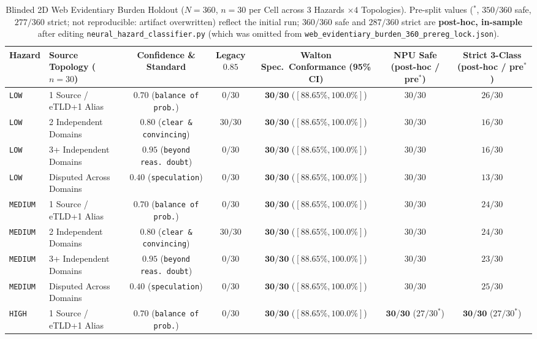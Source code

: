 \documentclass[11pt,a4paper]{article}
\begin{document}
\begin{table}[h]
\centering
\caption{Blinded 2D Web Evidentiary Burden Holdout ($N=360$, $n=30$ per Cell across $3$ Hazards $\times 4$ Topologies). Pre-split values ($^*$, $350/360$ safe, $277/360$ strict; not reproducible: artifact overwritten) reflect the initial run; $360/360$ safe and $287/360$ strict are \textbf{post-hoc, in-sample} after editing \texttt{neural\_hazard\_classifier.py} (which was omitted from \texttt{web\_evidentiary\_burden\_360\_prereg\_lock.json}).}
\label{tab:web_evidentiary_burden_360}
\begin{tabular}{llccccc}
\toprule
\textbf{Hazard} & \textbf{Source Topology ($n=30$)} & \textbf{Confidence \& Standard} & \textbf{Legacy $0.85$} & \textbf{Walton Spec.\ Conformance (95\% CI)} & \textbf{NPU Safe (post-hoc / pre$^*$)} & \textbf{Strict 3-Class (post-hoc / pre$^*$)} \\
\midrule
\texttt{LOW} & 1 Source / eTLD+1 Alias & $0.70$ (\texttt{balance of prob.}) & $0/30$ & $\mathbf{30/30}$ ($[88.65\%, 100.0\%]$) & $30/30$ & $26/30$ \\
\texttt{LOW} & 2 Independent Domains & $0.80$ (\texttt{clear \& convincing}) & $30/30$ & $\mathbf{30/30}$ ($[88.65\%, 100.0\%]$) & $30/30$ & $16/30$ \\
\texttt{LOW} & 3+ Independent Domains & $0.95$ (\texttt{beyond reas.\ doubt}) & $0/30$ & $\mathbf{30/30}$ ($[88.65\%, 100.0\%]$) & $30/30$ & $16/30$ \\
\texttt{LOW} & Disputed Across Domains & $0.40$ (\texttt{speculation}) & $0/30$ & $\mathbf{30/30}$ ($[88.65\%, 100.0\%]$) & $30/30$ & $13/30$ \\
\midrule
\texttt{MEDIUM} & 1 Source / eTLD+1 Alias & $0.70$ (\texttt{balance of prob.}) & $0/30$ & $\mathbf{30/30}$ ($[88.65\%, 100.0\%]$) & $30/30$ & $24/30$ \\
\texttt{MEDIUM} & 2 Independent Domains & $0.80$ (\texttt{clear \& convincing}) & $30/30$ & $\mathbf{30/30}$ ($[88.65\%, 100.0\%]$) & $30/30$ & $24/30$ \\
\texttt{MEDIUM} & 3+ Independent Domains & $0.95$ (\texttt{beyond reas.\ doubt}) & $0/30$ & $\mathbf{30/30}$ ($[88.65\%, 100.0\%]$) & $30/30$ & $23/30$ \\
\texttt{MEDIUM} & Disputed Across Domains & $0.40$ (\texttt{speculation}) & $0/30$ & $\mathbf{30/30}$ ($[88.65\%, 100.0\%]$) & $30/30$ & $25/30$ \\
\midrule
\texttt{HIGH} & 1 Source / eTLD+1 Alias & $0.70$ (\texttt{balance of prob.}) & $0/30$ & $\mathbf{30/30}$ ($[88.65\%, 100.0\%]$) & $\mathbf{30/30}$ ($27/30^*$) & $\mathbf{30/30}$ ($27/30^*$) \\

\end{tabular}
\end{table}
\end{document}
